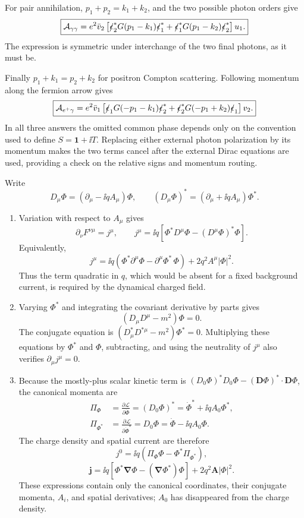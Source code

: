 \begin{enumerate}
\begin{enumerate}
For pair annihilation, \(p_1+p_2=k_1+k_2\), and the two possible photon
orders give
\[
 \boxed{
 \mathcal A_{\gamma\gamma}
 =e^2\bar v_2\left[
 \slashed\epsilon_2^*G(p_1-k_1)\slashed\epsilon_1^*
 +\slashed\epsilon_1^*G(p_1-k_2)\slashed\epsilon_2^*
 \right]u_1 .}
\]
The expression is symmetric under interchange of the two final photons, as
it must be.

Finally \(p_1+k_1=p_2+k_2\) for positron Compton scattering.  Following
momentum along the fermion arrow gives
\[
 \boxed{
 \mathcal A_{e^+\gamma}
 =e^2\bar v_1\left[
 \slashed\epsilon_1G(-p_1-k_1)\slashed\epsilon_2^*
 +\slashed\epsilon_2^*G(-p_1+k_2)\slashed\epsilon_1
 \right]v_2 .}
\]
In all three answers the omitted common phase depends only on the convention
used to define \(S=\mathbf1+\ii T\).  Replacing either external photon
polarization by its momentum makes the two terms cancel after the external
Dirac equations are used, providing a check on the relative signs and
momentum routing.
\end{enumerate}

Write
\[
 D_\mu\Phi=(\partial_\mu-\ii qA_\mu)\Phi,\qquad
 (D_\mu\Phi)^*=(\partial_\mu+\ii qA_\mu)\Phi^* .
\]
\begin{enumerate}
\item
Variation with respect to \(A_\mu\) gives
\[
 \partial_\nu F^{\nu\mu}=j^\mu,\qquad
 \boxed{
 j^\mu=\ii q\left[
 \Phi^*D^\mu\Phi-(D^\mu\Phi)^*\Phi
 \right].}
\]
Equivalently,
\[
 j^\mu
 =\ii q\left(\Phi^*\partial^\mu\Phi
 -\partial^\mu\Phi^*\,\Phi\right)
 +2q^2A^\mu|\Phi|^2 .
\]
Thus the term quadratic in \(q\), which would be absent for a fixed
background current, is required by the dynamical charged field.

\item
Varying \(\Phi^*\) and integrating the covariant derivative by parts gives
\[
 \boxed{(D_\mu D^\mu-m^2)\Phi=0.}
\]
The conjugate equation is
\((D_\mu^*D^{*\mu}-m^2)\Phi^*=0\).  Multiplying these equations by
\(\Phi^*\) and \(\Phi\), subtracting, and using the neutrality of \(j^\mu\)
also verifies \(\partial_\mu j^\mu=0\).

\item
Because the mostly-plus scalar kinetic term is
\((D_0\Phi)^*D_0\Phi-(\mathbf D\Phi)^*\cdot\mathbf D\Phi\), the canonical
momenta are
\[
 \boxed{\begin{aligned}
 \Pi_\Phi
 &=\frac{\partial\mathcal L}{\partial\dot\Phi}
 =(D_0\Phi)^*=\dot\Phi^*+\ii qA_0\Phi^*,\\
 \Pi_{\Phi^*}
 &=\frac{\partial\mathcal L}{\partial\dot\Phi^*}
 =D_0\Phi=\dot\Phi-\ii qA_0\Phi .
 \end{aligned}}
\]
The charge density and spatial current are therefore
\[
 \boxed{
 j^0=\ii q\left(\Pi_\Phi\Phi-\Phi^*\Pi_{\Phi^*}\right),}
\]
\[
 \boxed{
 \mathbf j
 =\ii q\left[\Phi^*\boldsymbol\nabla\Phi
 -(\boldsymbol\nabla\Phi^*)\Phi\right]
 +2q^2\mathbf A|\Phi|^2 .}
\]
These expressions contain only the canonical coordinates, their conjugate
momenta, \(A_i\), and spatial derivatives; \(A_0\) has disappeared from the
charge density.


\end{enumerate}
\end{enumerate}

